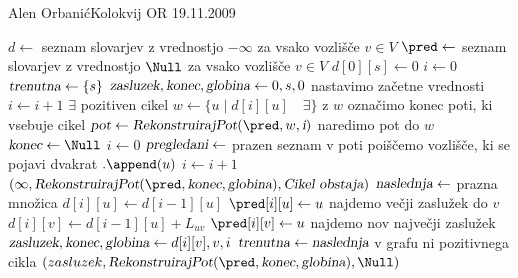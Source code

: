 \begin{naloga}{Alen Orbanić}{Kolokvij OR 19.11.2009}
\begin{odgovor}
\begin{enumerate}[(a)]
\begin{small}
\begin{algorithmic}
    \State $d \gets$ seznam slovarjev z vrednostjo $- \infty$ za vsako vozlišče $v \in V$
    \State $\pred \gets$ seznam slovarjev z vrednostjo $\Null$
    za vsako vozlišče $v \in V$
    \State $d[0][s] \gets 0$
    \State $i \gets 0$
    \State $\text{\sl trenutna} \gets \{s\}$
    \State $\text{\sl zasluzek}, \text{\sl konec}, \text{\sl globina} \gets 0,s,0$  \hfill nastavimo začetne vrednosti
        \State $i \gets i+1$
         \hfill $\exists$ pozitiven cikel
            \State $w\gets \{ u \mid d[i][u] \quad  \exists \}$ \hfill z $w$ označimo konec poti, ki vsebuje cikel
            \State $\text{\sl pot} \gets \text{\sl RekonstruirajPot}(\pred, w,\text{\sl i})$ \hfill naredimo pot do $w$
            \State $\text{\sl konec} \gets \Null$
            \State $i \gets 0$
            \State $\text{\sl pregledani} \gets$ prazen seznam
             \hfill v poti poiščemo vozlišče, ki se pojavi dvakrat
                $.\append(u)$
                \EndIf
                \State$i \gets i + 1$
            \EndFor
            \State \Return $(\infty, \text{\sl RekonstruirajPot}(\pred, \text{\sl konec},\text{\sl globina}),\text{\sl Cikel obstaja})$    
        \EndIf 
        \State $\text{\sl{naslednja}} \gets$ prazna množica
            \State $d[i][u] \gets d[i-1][u]$
            \State $\pred[i][u] \gets u$
                 \hfill najdemo večji zaslužek do $v$
                    \State $d[i][v] \gets d[i-1][u] +  L_{uv}$ 
                    \State $\pred[i][v] \gets u$
                \EndIf
                 \hfill najdemo nov največji zaslužek
                    \State $\text{\sl zasluzek}, \text{\sl konec}, \text{\sl globina} \gets d[i][v],v,i$
                \EndIf
            \EndFor
        \EndFor
        \State $\text{\sl{trenutna}} \gets \text{\sl{naslednja}}$
    \EndWhile \hfill v grafu ni pozitivnega cikla
    \State \Return $(zasluzek, \text{\sl RekonstruirajPot}(\pred, \text{\sl konec},\text{\sl globina}), \Null)$
\EndFunction
\end{algorithmic}



\end{small}
\end{enumerate}
\end{odgovor}
\end{naloga}
